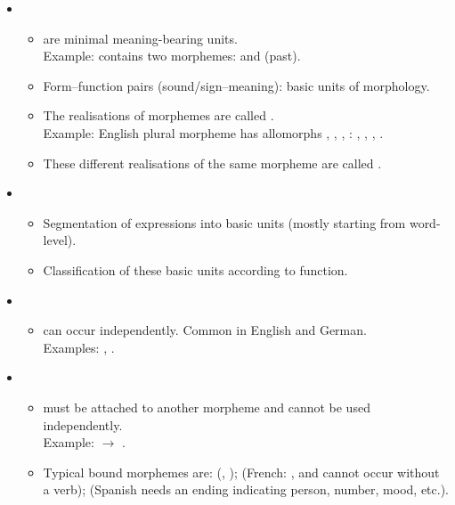 \documentclass[a4paper,landscape,headrule,footrule]{foils}
\begin{document}
\begin{itemize}
\item {} 
  \begin{itemize}
    \item {} are minimal meaning-bearing units.\\
          Example:  contains two morphemes:  and  (past).
    \item Form–function pairs (sound/sign–meaning): basic units of morphology.
    \item The realisations of morphemes are called .\\
          Example: English plural morpheme \txx{[number pl]} has allomorphs , , , \eng{$\emptyset$}: , , , .
    \item These different realisations of the same morpheme are called .
  \end{itemize}
\item {}\\
  \begin{itemize}
    \item Segmentation of expressions into basic units (mostly starting from word-level).
    \item Classification of these basic units according to function.
    \end{itemize}
\end{itemize}


  \begin{itemize}
  \item {}\\
  \begin{itemize}
    \item {} can occur independently. Common in English and German.\\
          Examples: , .
  \end{itemize}
  \medskip
  \item {}\\
  \begin{itemize}
    \item {} must be attached to another morpheme and cannot be used independently.\\
          Example: \txx{[number pl]}  $\rightarrow$ .
    \item Typical bound morphemes are:  (, );  (French: ,  and  cannot occur without a verb);  (Spanish  needs an ending indicating person, number, mood, etc.).
    \end{itemize}
  \end{itemize}
\end{document}
